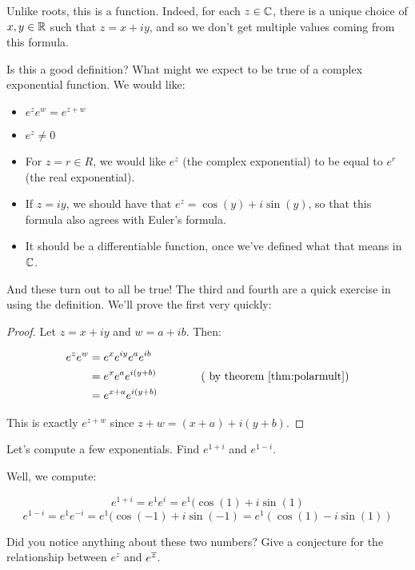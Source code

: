 Unlike roots, this is a function. Indeed, for each $z\in \mathbb{C}$, there is a unique choice of $x,y\in \mathbb{R}$ such that $z = x+iy$, and so we don't get multiple values coming from this formula.

Is this a good definition? What might we expect to be true of a complex exponential function. We would like:

\begin{itemize}
\item $e^ze^w = e^{z + w}$
\item $e^z \ne 0$
\item For $z = r\in R$, we would like $e^z$ (the complex exponential) to be equal to $e^r$ (the real exponential).
\item If $z = iy$, we should have that $e^z = \cos(y) + i\sin(y)$, so that this formula also agrees with Euler's formula.
\item It should be a differentiable function, once we've defined what that means in $\mathbb{C}$.

\end{itemize}


And these turn out to all be true! The third and fourth are a quick exercise in using the definition. We'll prove the first very quickly:

\begin{proof} Let $z = x + iy$ and $w = a + ib$. Then:

\begin{align*} e^ze^w &= e^xe^{iy}e^ae^{ib} \\
&= e^xe^ae^{i(y+b)} \qquad \qquad (\text{ by theorem }\ref{thm:polarmult})\\
&= e^{x+a}e^{i(y+b)}\end{align*}

This is exactly $e^{z + w}$ since $z + w = (x+a) + i(y+b)$.\end{proof}


\begin{ex}{}{} Let's compute a few exponentials. Find $e^{1 + i}$ and $e^{1-i}$.

Well, we compute:

$$e^{1 + i} = e^1e^{i} = e^1(\cos(1) + i\sin(1)$$
$$e^{1 - i} = e^1e^{-i} = e^1(\cos(-1) + i\sin(-1) = e^1(\cos(1) - i\sin(1))$$

\end{ex}

Did you notice anything about these two numbers? Give a conjecture for the relationship between $e^z$ and $e^{\overline{z}}$.

